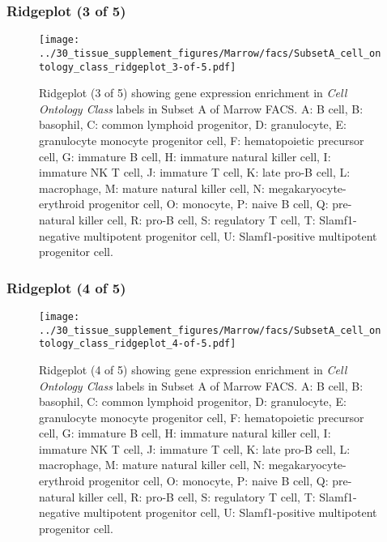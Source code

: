 \subsubsection{Ridgeplot (3 of 5)}
\begin{figure}[h]
\centering
\texttt{[image: ../30\_tissue\_supplement\_figures/Marrow/facs/SubsetA\_cell\_ontology\_class\_ridgeplot\_3-of-5.pdf]}

\caption{ Ridgeplot (3 of 5)  showing gene expression enrichment in \emph{Cell Ontology Class} labels in Subset A of Marrow FACS. A: B cell, B: basophil, C: common lymphoid progenitor, D: granulocyte, E: granulocyte monocyte progenitor cell, F: hematopoietic precursor cell, G: immature B cell, H: immature natural killer cell, I: immature NK T cell, J: immature T cell, K: late pro-B cell, L: macrophage, M: mature natural killer cell, N: megakaryocyte-erythroid progenitor cell, O: monocyte, P: naive B cell, Q: pre-natural killer cell, R: pro-B cell, S: regulatory T cell, T: Slamf1-negative multipotent progenitor cell, U: Slamf1-positive multipotent progenitor cell.}
\end{figure}


\clearpage

\subsubsection{Ridgeplot (4 of 5)}
\begin{figure}[h]
\centering
\texttt{[image: ../30\_tissue\_supplement\_figures/Marrow/facs/SubsetA\_cell\_ontology\_class\_ridgeplot\_4-of-5.pdf]}

\caption{ Ridgeplot (4 of 5)  showing gene expression enrichment in \emph{Cell Ontology Class} labels in Subset A of Marrow FACS. A: B cell, B: basophil, C: common lymphoid progenitor, D: granulocyte, E: granulocyte monocyte progenitor cell, F: hematopoietic precursor cell, G: immature B cell, H: immature natural killer cell, I: immature NK T cell, J: immature T cell, K: late pro-B cell, L: macrophage, M: mature natural killer cell, N: megakaryocyte-erythroid progenitor cell, O: monocyte, P: naive B cell, Q: pre-natural killer cell, R: pro-B cell, S: regulatory T cell, T: Slamf1-negative multipotent progenitor cell, U: Slamf1-positive multipotent progenitor cell.}
\end{figure}


\clearpage


